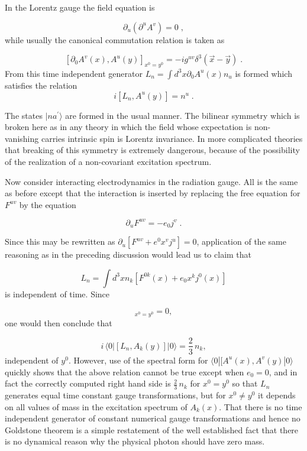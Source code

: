 \documentclass[%
  12pt,
  paper=letter,
  abstracton,
  pagesize=auto,
  version=last,
  DIV=calc
  ]{scrartcl}
\begin{document}
In the Lorentz gauge the field equation is

\[\partial_u (\partial^u A^v) = 0\; ,\]
while usually the canonical commutation relation is taken as

\begin{equation}
\label{eq:4}
[\partial_0 A^v (x), A^u (y)]_{x^0=y^0}=-i g^{u v} \delta^3 (\vec x - \vec y) \; .
\end{equation}
From this time independent generator $L_n=\int d^3 x \partial_0 A^u
(x) n_u$ is formed which satisfies the relation
\[i [L_n, A^u (y)] = n^u \; .\]

The states $|na^{\prime}\rangle$ are formed in the usual manner.  The
bilinear symmetry which is broken here as in any theory in which the
field whose expectation is non-vanishing carries intrinsic spin is
Lorentz invariance.  In more complicated theories that breaking of
this symmetry is extremely dangerous, because of the possibility of
the realization of a non-covariant excitation spectrum.

Now consider interacting electrodynamics in the radiation gauge.  All
is the same as before except that the interaction is inserted by
replacing the free equation for $F^{uv}$ by the equation

\[\partial_u F^{uv}=-e_0 j^v\; .\]

Since this may be rewritten as $\partial_u[F^{uv} + e^0 x^v j^u]=0$,
application of the same reasoning as in the preceding discussion would
lead us to claim that

\begin{equation*}
L_n=\int d^3 x n_k [ F^{0k} (x) + e_0 x^k j^0 (x)]
\end{equation*}
is independent of time.  Since

\begin{equation*}
[j^0 (x), A^k (y)]_{x^0=y^0} = 0,
\end{equation*}
one would then conclude that

\begin{equation*}
i\, \langle 0 | [ L_n, A_k (y) ] |0\rangle = \frac {2}{3}\, n_k,
\end{equation*}
independent of $y^0$.  However, use of the spectral form for
$\langle 0|[A^u(x), A^v (y)|0\rangle$ quickly shows that the above relation cannot
be true except when $e_0=0$, and in fact the correctly computed right
hand side is $\frac{2}{3}\, n_k$ for $x^0=y^0$ so that $L_n$ generates
equal time constant gauge transformations, but for $x^0\neq y^0$ it
depends on all values of mass in the excitation spectrum of $A_k (x)$.
That there is no time independent generator of constant numerical
gauge transformations and hence no Goldstone theorem is a simple
restatement of the well established fact that there is no dynamical
reason why the physical photon should have zero mass\cite {12}.
\end{document}
